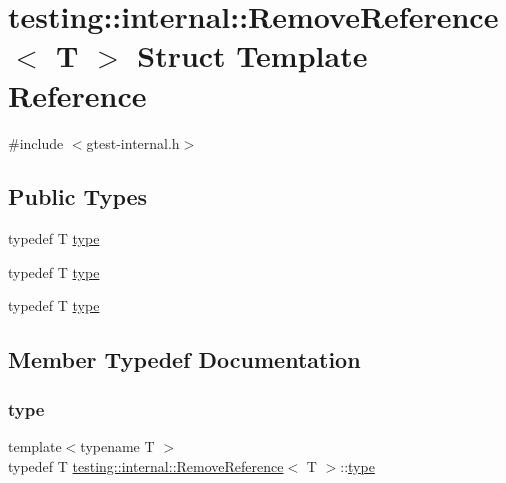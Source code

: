 \hypertarget{structtesting_1_1internal_1_1_remove_reference}{}\section{testing\+::internal\+::Remove\+Reference$<$ T $>$ Struct Template Reference}
\label{structtesting_1_1internal_1_1_remove_reference}


{\ttfamily \#include $<$gtest-\/internal.\+h$>$}

\subsection*{Public Types}
\begin{DoxyCompactItemize}
\item 
typedef T \mbox{\hyperlink{structtesting_1_1internal_1_1_remove_reference_a9ca4f6499579225f7986b789ee4b2895}{type}}
\item 
typedef T \mbox{\hyperlink{structtesting_1_1internal_1_1_remove_reference_a9ca4f6499579225f7986b789ee4b2895}{type}}
\item 
typedef T \mbox{\hyperlink{structtesting_1_1internal_1_1_remove_reference_a9ca4f6499579225f7986b789ee4b2895}{type}}
\end{DoxyCompactItemize}


\subsection{Member Typedef Documentation}
\mbox{\label{structtesting_1_1internal_1_1_remove_reference_a9ca4f6499579225f7986b789ee4b2895}} 
\subsubsection{\texorpdfstring{type}{type}\hspace{0.1cm}{\footnotesize\ttfamily [1/3]}}
{\footnotesize\ttfamily template$<$typename T $>$ \\
typedef T \mbox{\hyperlink{structtesting_1_1internal_1_1_remove_reference}{testing\+::internal\+::\+Remove\+Reference}}$<$ T $>$\+::\mbox{\hyperlink{structtesting_1_1internal_1_1_remove_reference_a9ca4f6499579225f7986b789ee4b2895}{type}}}

